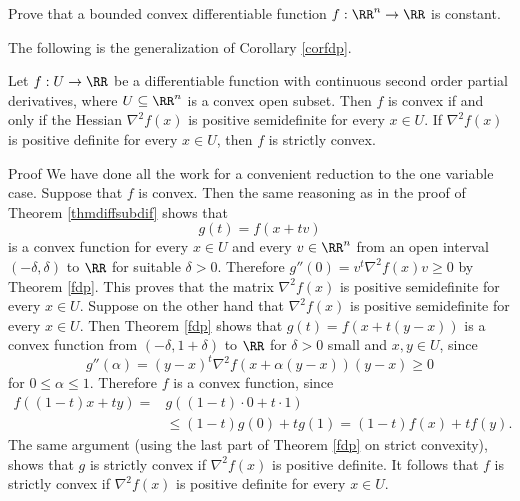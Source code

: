 \documentclass{article}
\begin{document}
\beginshex
  Prove that a bounded convex differentiable function $f:\RR^n\rightarrow \RR$ is
  constant.
\endshex


The following is the generalization of  Corollary \ref{corfdp}.

\newcommand{\Hess}[1]{\nabla^2 #1}

\begin{theorem}[emph]\label{thmhessconv}
  Let $f: U\rightarrow \RR$ be a differentiable function with continuous
  second order partial derivatives, where $U\subseteq \RR^n$ is a
  convex open subset. Then $f$ is convex if and only if the Hessian
  $\Hess{f}(x)$ is positive semidefinite for every $x\in U$. If
  $\Hess{f}(x)$ is positive definite for every $x\in U$, then $f$ is
  strictly convex.
\end{theorem}
\begin{hideinbutton}{Proof}
  We have done all the work for a convenient reduction to the one
  variable case. Suppose that $f$ is convex. Then the same reasoning
  as in the proof of Theorem \ref{thmdiffsubdif} shows that
  \begin{equation*}
    g(t) = f(x + t v)
  \end{equation*}
  is a convex function for every $x\in U$ and every $v\in \RR^n$ from
  an open interval $(-\delta, \delta)$ to $\RR$ for suitable
  $\delta>0$. Therefore $g''(0) = v^t \Hess{f}(x) v \geq 0$ by
  Theorem \ref{fdp}. This proves that the matrix $\Hess{f}(x)$ is
  positive semidefinite for every $x\in U$.  Suppose on the other hand
  that $\Hess{f}(x)$ is positive semidefinite for every $x\in U$.
  Then Theorem \ref{fdp} shows that $g(t) = f(x + t(y-x))$ is a convex
  function from $(-\delta, 1+\delta)$ to $\RR$ for $\delta>0$ small
  and $x, y\in U$, since
  \begin{equation*}
    g''(\alpha) = (y-x)^t \Hess{f}(x + \alpha(y-x)) (y-x) \geq 0
  \end{equation*}
  for $0\leq \alpha \leq 1$. Therefore $f$ is a convex function, since
  \begin{align*}
    f((1-t) x + t y) = &g((1-t)\cdot 0 + t\cdot 1) \\
    &\leq(1-t) g(0) + t g(1) = (1-t) f(x) + t f(y).
  \end{align*}
  The same argument (using the last part of Theorem \ref{fdp} on
  strict convexity), shows that $g$ is strictly convex if
  $\Hess{f}(x)$ is positive definite. It follows that $f$ is strictly
  convex if $\Hess{f}(x)$ is positive definite for every $x\in U$.
\end{hideinbutton}
\end{document}
